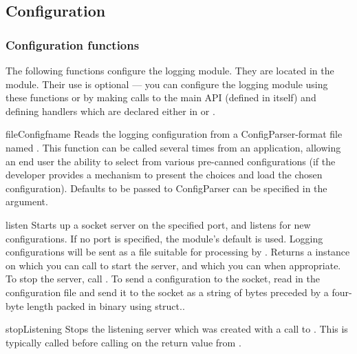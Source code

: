 \subsection{Configuration}


\subsubsection{Configuration functions%
               \label{logging-config-api}}

The following functions configure the logging module. They are located in the
 module.  Their use is optional --- you can configure
the logging module using these functions or by making calls to the
main API (defined in  itself) and defining handlers
which are declared either in  or
.

\begin{funcdesc}{fileConfig}{fname}
Reads the logging configuration from a ConfigParser-format file named
. This function can be called several times from an application,
allowing an end user the ability to select from various pre-canned
configurations (if the developer provides a mechanism to present the
choices and load the chosen configuration). Defaults to be passed to
ConfigParser can be specified in the  argument.
\end{funcdesc}

\begin{funcdesc}{listen}{}
Starts up a socket server on the specified port, and listens for new
configurations. If no port is specified, the module's default
 is used. Logging configurations
will be sent as a file suitable for processing by .
Returns a  instance on which you can call 
to start the server, and which you can  when appropriate.
To stop the server, call . To send a configuration
to the socket, read in the configuration file and send it to the socket
as a string of bytes preceded by a four-byte length packed in binary using
struct..
\end{funcdesc}

\begin{funcdesc}{stopListening}{}
Stops the listening server which was created with a call to
. This is typically called before calling 
on the return value from .
\end{funcdesc}

